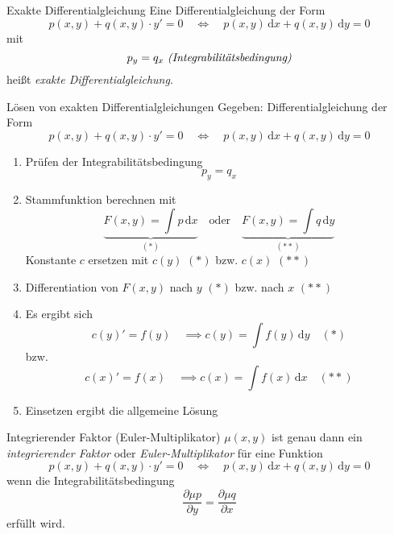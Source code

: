 \documentclass[german]{../spicker}
\renewcommand{\d}{\,\mathrm{d}}
\begin{document}
\begin{defi}{Exakte Differentialgleichung}
    Eine Differentialgleichung der Form
    $$
        p(x, y) + q(x, y) \cdot y' = 0 \quad \iff \quad p(x, y) \d x + q(x, y) \d y = 0
    $$
    mit
    $$
        p_y = q_x \ \text{\emph{(Integrabilitätsbedingung)}}
    $$
    heißt \emph{exakte Differentialgleichung}.
\end{defi}

\begin{algo}{Lösen von exakten Differentialgleichungen}
    Gegeben: Differentialgleichung der Form
    $$
        \boxed{p(x, y) + q(x, y) \cdot y' = 0 \quad \iff \quad p(x, y) \d x + q(x, y) \d y = 0}
    $$
    \begin{enumerate}
        \item Prüfen der Integrabilitätsbedingung
              $$
                  p_y = q_x
              $$
        \item Stammfunktion berechnen mit
              $$
                  \underbrace{F(x, y) = \int p \d x}_{(*)} \quad \text{oder} \quad \underbrace{F(x, y) = \int q \d y}_{(**)}
              $$
              \subitem Konstante $c$ ersetzen mit $c(y)$ $(*)$ bzw. $c(x)$ $(**)$
        \item Differentiation von $F(x, y)$ nach $y$ $(*)$ bzw. nach $x$ $(**)$
        \item Es ergibt sich
              $$
                  c(y)' = f(y) \quad \implies c(y) = \int f(y) \d y \quad (*)
              $$
              bzw.
              $$
                  c(x)' = f(x) \quad \implies c(x) = \int f(x) \d x \quad (**)
              $$
        \item Einsetzen ergibt die allgemeine Lösung
    \end{enumerate}
\end{algo}

\begin{defi}{Integrierender Faktor (Euler-Multiplikator)}
    $\mu(x, y)$ ist genau dann ein \emph{integrierender Faktor} oder \emph{Euler-Multiplikator} für eine Funktion
    $$
        p(x, y) + q(x, y) \cdot y' = 0 \quad \iff \quad p(x, y) \d x + q(x, y) \d y = 0
    $$
    wenn die Integrabilitätsbedingung
    $$
        \frac{\partial \mu p}{\partial y} = \frac{\partial \mu q}{\partial x}
    $$
    erfüllt wird.
\end{defi}
\end{document}
